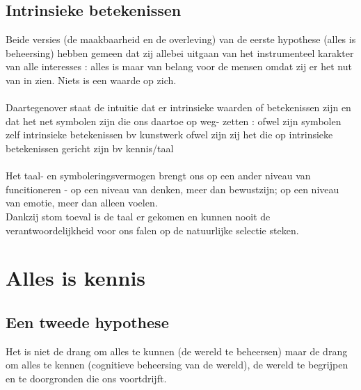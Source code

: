 \documentclass[11pt,a4paper]{article}
\begin{document}
\subsection{Intrinsieke betekenissen}
Beide versies (de maakbaarheid en de overleving) van de eerste hypothese (alles is beheersing) hebben gemeen dat zij allebei uitgaan van het instrumenteel karakter van alle interesses : alles is maar van belang voor de mensen omdat zij er het nut van in zien. Niets is een waarde op zich.
\\
\\
Daartegenover staat de intuitie dat er intrinsieke waarden of betekenissen zijn en dat het net symbolen zijn die ons daartoe op weg- zetten : ofwel zijn symbolen zelf intrinsieke betekenissen bv kunstwerk ofwel zijn zij het die op intrinsieke betekenissen gericht zijn bv kennis/taal
\\
\\
Het taal- en symboleringsvermogen brengt ons op een ander niveau van funcitioneren - op een niveau van denken, meer dan bewustzijn; op een niveau van emotie, meer dan alleen voelen.
\\
Dankzij stom toeval is de taal er gekomen en kunnen nooit de verantwoordelijkheid voor ons falen op de natuurlijke selectie steken.
\section{Alles is kennis}
\subsection{Een tweede hypothese}
Het is niet de drang om alles te kunnen (de wereld te beheersen) maar de drang om alles te kennen (cognitieve beheersing van de wereld), de wereld te begrijpen en te doorgronden die ons voortdrijft.
\end{document}
